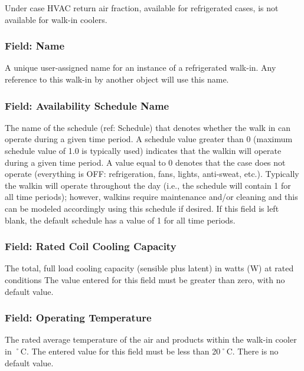 Under case HVAC return air fraction, available for refrigerated cases, is not available for walk-in coolers.

\subsubsection{Field: Name}\label{field-name-3-026}

A unique user-assigned name for an instance of a refrigerated walk-in. Any reference to this walk-in by another object will use this name.

\subsubsection{Field: Availability Schedule Name}\label{field-availability-schedule-name-1-011}

The name of the schedule (ref: Schedule) that denotes whether the walk in can operate during a given time period. A schedule value greater than 0 (maximum schedule value of 1.0 is typically used) indicates that the walkin will operate during a given time period. A value equal to 0 denotes that the case does not operate (everything is OFF: refrigeration, fans, lights, anti-sweat, etc.). Typically the walkin will operate throughout the day (i.e., the schedule will contain 1 for all time periods); however, walkins require maintenance and/or cleaning and this can be modeled accordingly using this schedule if desired. If this field is left blank, the default schedule has a value of 1 for all time periods.

\subsubsection{Field: Rated Coil Cooling Capacity}\label{field-rated-coil-cooling-capacity}

The total, full load cooling capacity (sensible plus latent) in watts (W) at rated conditions The value entered for this field must be greater than zero, with no default value.

\subsubsection{Field: Operating Temperature}\label{field-operating-temperature}

The rated average temperature of the air and products within the walk-in cooler in ˚C. The entered value for this field must be less than 20˚C. There is no default value.

